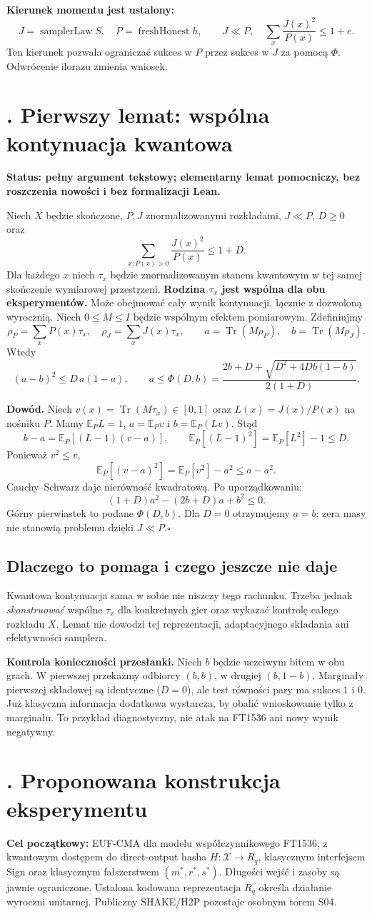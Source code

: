 \documentclass[10pt,a4paper]{article}
\newcommand{\head}[1]{\section*{\color{ink}\sffamily #1}}
\newcommand{\subhead}[1]{\subsection*{\color{ink}\sffamily #1}}
\newcommand{\E}{\mathbb E}
\newcommand{\Tr}{\operatorname{Tr}}
\newcommand{\PhiF}{\Phi}
\begin{document}
\textbf{Kierunek momentu jest ustalony:}
\[
 J=\operatorname{samplerLaw}S,\quad P=\operatorname{freshHonest}h,\qquad
 J\ll P,\quad\sum_x\frac{J(x)^2}{P(x)}\le 1+e.
\]
Ten kierunek pozwala ograniczać sukces w $P$ przez sukces w $J$ za pomocą $\Phi$. Odwrócenie ilorazu zmienia wniosek.

\newpage
\head{4. Pierwszy lemat: wspólna kontynuacja kwantowa}
\textbf{Status: pełny argument tekstowy; elementarny lemat pomocniczy, bez roszczenia nowości i bez formalizacji Lean.}

Niech $X$ będzie skończone, $P,J$ znormalizowanymi rozkładami, $J\ll P$, $D\ge0$ oraz
\[
 \sum_{x:P(x)>0}\frac{J(x)^2}{P(x)}\le 1+D.
\]
Dla każdego $x$ niech $\tau_x$ będzie znormalizowanym stanem kwantowym w tej samej skończenie wymiarowej przestrzeni. \textbf{Rodzina $\tau_x$ jest wspólna dla obu eksperymentów.} Może obejmować cały wynik kontynuacji, łącznie z dozwoloną wyrocznią. Niech $0\le M\le I$ będzie wspólnym efektem pomiarowym. Zdefiniujmy
\[
 \rho_P=\sum_xP(x)\tau_x,\quad \rho_J=\sum_xJ(x)\tau_x,
 \qquad a=\Tr(M\rho_P),\quad b=\Tr(M\rho_J).
\]
Wtedy
\[
 (a-b)^2\le D\,a(1-a),\qquad
 a\le\PhiF(D,b)=\frac{2b+D+\sqrt{D^2+4Db(1-b)}}{2(1+D)}.
\]

\textbf{Dowód.} Niech $v(x)=\Tr(M\tau_x)\in[0,1]$ oraz $L(x)=J(x)/P(x)$ na nośniku $P$. Mamy $\E_P L=1$, $a=\E_Pv$ i $b=\E_P(Lv)$. Stąd
\[
 b-a=\E_P[(L-1)(v-a)],\qquad
 \E_P[(L-1)^2]=\E_P[L^2]-1\le D.
\]
Ponieważ $v^2\le v$,
\[
 \E_P[(v-a)^2]=\E_P[v^2]-a^2\le a-a^2.
\]
Cauchy--Schwarz daje nierówność kwadratową. Po uporządkowaniu:
\[
 (1+D)a^2-(2b+D)a+b^2\le0.
\]
Górny pierwiastek to podane $\PhiF(D,b)$. Dla $D=0$ otrzymujemy $a=b$; zera masy nie stanowią problemu dzięki $J\ll P$.\hfill$\square$

\subhead{Dlaczego to pomaga i czego jeszcze nie daje}
Kwantowa kontynuacja sama w sobie nie niszczy tego rachunku. Trzeba jednak \emph{skonstruować} wspólne $\tau_x$ dla konkretnych gier oraz wykazać kontrolę całego rozkładu $X$. Lemat nie dowodzi tej reprezentacji, adaptacyjnego składania ani efektywności samplera.

\textbf{Kontrola konieczności przesłanki.} Niech $b$ będzie uczciwym bitem w obu grach. W pierwszej przekażmy odbiorcy $(b,b)$, w drugiej $(b,1-b)$. Marginały pierwszej składowej są identyczne ($D=0$), ale test równości pary ma sukces $1$ i $0$. Już klasyczna informacja dodatkowa wystarcza, by obalić wnioskowanie tylko z marginału. To przykład diagnostyczny, nie atak na FT1536 ani nowy wynik negatywny.

\newpage
\head{5. Proponowana konstrukcja eksperymentu}
\textbf{Cel początkowy:} EUF-CMA dla modelu współczynnikowego FT1536, z kwantowym dostępem do direct-output hasha $H:\mathcal X\to R_q$, klasycznym interfejsem Sign oraz klasycznym fałszerstwem $(m^*,r^*,s^*)$. Długości wejść i zasoby są jawnie ograniczone. Ustalona kodowana reprezentacja $R_q$ określa działanie wyroczni unitarnej. Publiczny SHAKE/H2P pozostaje osobnym torem S04.
\end{document}
